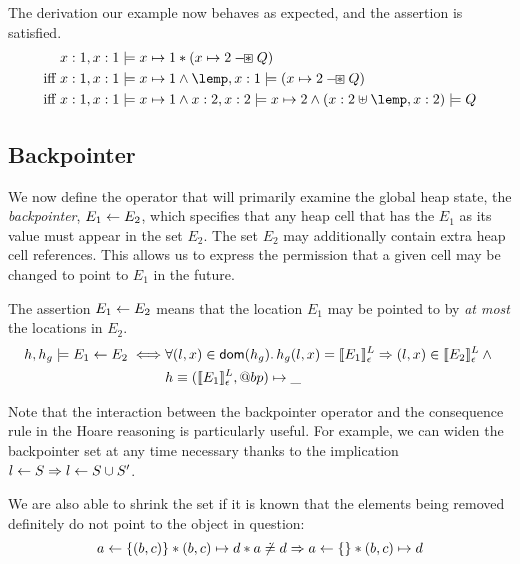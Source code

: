 \documentclass[a4paper,notitlepage]{report}
\begin{document}
The derivation our example now behaves as expected, and the assertion is
satisfied.
\begin{align*}
           & x:1,x:1 \satisfies x \pointsto 1 \sep (x \pointsto 2 \boxwand Q) \\
\text{iff } & x:1,x:1 \satisfies x \pointsto 1 \land \lemp,x:1 \satisfies (x \pointsto 2 \boxwand Q) \\
\text{iff } & x:1,x:1 \satisfies x \pointsto 1 \land x:2,x:2 \satisfies x \pointsto 2 \land (x:2 \disju \lemp,x:2) \satisfies Q
\end{align*}


\subsection{Backpointer}
\label{sec:backpointers}
We now define the operator that will primarily examine the global heap state,
the \emph{backpointer}, $E_1 \leftarrow E_2$, which specifies that any heap cell that
has the $E_1$ as its value must appear in the set $E_2$. The set $E_2$ may
additionally contain extra heap cell references. This allows us to express the
permission that a given cell may be changed to point to $E_1$ in the future.

The assertion $E_1 \leftarrow E_2$ means that the location $E_1$ may be pointed to by
\emph{at most} the locations in $E_2$.
\begin{align*}
  h, h_g \models E_1 \leftarrow E_2 \iff &
    \forall (l,x) \in \mathsf{dom}(h_g) \mathpunct{.} h_g(l,x) = \llbracket E_1 \rrbracket^L_\epsilon
    \Rightarrow (l,x) \in \llbracket E_2 \rrbracket^L_\epsilon \land {} \\
    & h \equiv (\llbracket E_1 \rrbracket^L_\epsilon, @bp) \mapsto \_
\end{align*}

Note that the interaction between the backpointer operator and the consequence rule in the
Hoare reasoning is particularly useful.
For example, we can widen the backpointer set at any time necessary thanks to
the implication $l \leftarrow S \Rightarrow l \leftarrow S \cup S'$.

We are also able to shrink the set if it is known that the elements being
removed definitely do not point to the object in question:
\[
  a \leftarrow \{(b,c)\} \mathbin{*} (b,c) \mapsto d \mathbin{*} a \not\doteq d \Rightarrow a \leftarrow \{\} \mathbin{*} (b,c) \mapsto d
\]
\end{document}
